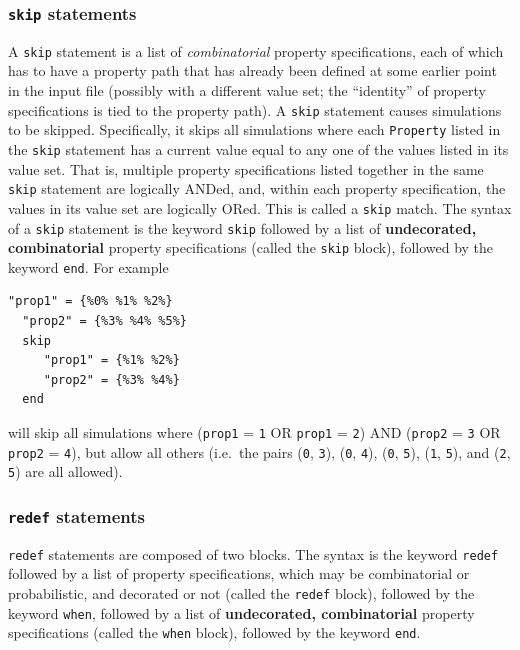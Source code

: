 \documentclass{article}
\begin{document}
\subsubsection{{\tt skip} statements}
\label{psl:control-struct:skip}

A {\tt skip} statement is a list of \textit{combinatorial} property specifications, each of which has to have a property path that has already been defined at some earlier point in the input file (possibly with a different value set; the ``identity'' of property specifications is tied to the property path). A {\tt skip} statement causes simulations to be skipped. Specifically, it skips all simulations where each {\tt Property} listed in the {\tt skip} statement has a current value equal to any one of the values listed in its value set. That is, multiple property specifications listed together in the same {\tt skip} statement are logically ANDed, and, within each property specification, the values in its value set are logically ORed. This is called a {\tt skip} match. The syntax of a {\tt skip} statement is the keyword {\tt skip} followed by a list of \textbf{undecorated, combinatorial} property specifications (called the {\tt skip} block), followed by the keyword {\tt end}. For example

\begin{lstlisting}[]
  "prop1" = {%0% %1% %2%}
  "prop2" = {%3% %4% %5%}
  skip
     "prop1" = {%1% %2%}
     "prop2" = {%3% %4%}
  end
\end{lstlisting}

will skip all simulations where ({\tt prop1} = {\tt 1} OR {\tt prop1} = {\tt 2}) AND ({\tt prop2} = {\tt 3} OR {\tt prop2} = {\tt 4}), but allow all others (i.e.\ the pairs ({\tt 0}, {\tt 3}), ({\tt 0}, {\tt 4}), ({\tt 0}, {\tt 5}), ({\tt 1}, {\tt 5}), and ({\tt 2}, {\tt 5}) are all allowed).

\subsubsection{{\tt redef} statements}

{\tt redef} statements are composed of two blocks. The syntax is the keyword {\tt redef} followed by a list of property specifications, which may be combinatorial or probabilistic, and decorated or not (called the {\tt redef} block), followed by the keyword {\tt when}, followed by a list of \textbf{undecorated, combinatorial} property specifications (called the {\tt when} block), followed by the keyword {\tt end}.
\end{document}
